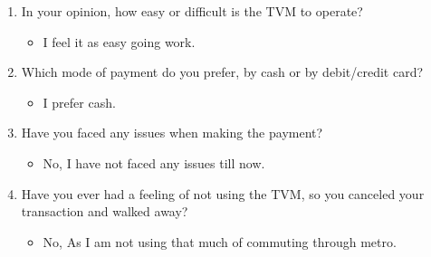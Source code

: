 \documentclass[15pt]{article}
\begin{document}
\begin{appendices}
\begin{enumerate}[leftmargin=3em, itemsep=0pt, parsep=0pt, , font=\Large\bfseries]
\begin{enumerate}[leftmargin=2em, itemsep=0pt, parsep=0pt, , font=\Large\bfseries]
            \vspace{0.2cm}
        \item {\Large In your opinion, how easy or difficult is the TVM to operate?}
        \vspace{0.1cm}
            \begin{itemize}
                \item {\Large I feel it as easy going work.}
            \end{itemize}
            \vspace{0.2cm}
        \item {\Large Which mode of payment do you prefer, by cash or by debit/credit card?}
            \begin{itemize}
                \item {\Large I prefer cash.}
            \end{itemize}
            \vspace{0.2cm}
        \item {\Large Have you faced any issues when making the payment?}
        \vspace{0.1cm}
            \begin{itemize}
                \item {\Large No, I have not faced any issues till now.}
            \end{itemize}
            \vspace{0.2cm}
        \item {\Large Have you ever had a feeling of not using the TVM, so you canceled your transaction and walked away?}
        \vspace{0.1cm}
            \begin{itemize}
                \item {\Large No, As I am not using that much of commuting through metro.}
            \end{itemize}
            \vspace{0.2cm}
    \end{enumerate}
    

\end{enumerate}
\end{appendices}
\end{document}
